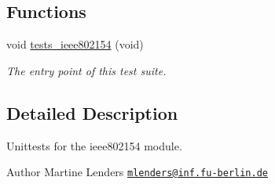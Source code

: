 \subsection*{Functions}
\begin{DoxyCompactItemize}
\item 
void \hyperlink{group__unittests_ga610840bb2928eb0ca34a53f887a7e884}{tests\+\_\+ieee802154} (void)
\begin{DoxyCompactList}\small\item\em The entry point of this test suite. \end{DoxyCompactList}\end{DoxyCompactItemize}


\subsection{Detailed Description}
Unittests for the {\ttfamily ieee802154} module. 

\begin{DoxyAuthor}{Author}
Martine Lenders \href{mailto:mlenders@inf.fu-berlin.de}{\tt mlenders@inf.\+fu-\/berlin.\+de} 
\end{DoxyAuthor}
